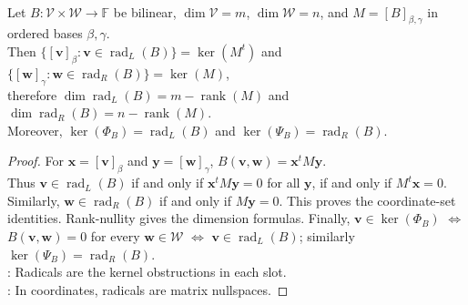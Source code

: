 \begin{proposition} \label{prop:bilinear-radicals-matrix-and-dual-maps} \\
Let $B:\mathcal{V}\times\mathcal{W}\to\mathbb{F}$ be bilinear, $\dim\mathcal{V}=m$, $\dim\mathcal{W}=n$, and $M=[B]_{\beta,\gamma}$ in ordered bases $\beta,\gamma$.\\
Then $\{[\mathbf{v}]_{\beta}:\mathbf{v}\in\operatorname{rad}_{L}(B)\}=\ker(M^t)$ and $\{[\mathbf{w}]_{\gamma}:\mathbf{w}\in\operatorname{rad}_{R}(B)\}=\ker(M)$,\\
therefore $\dim\operatorname{rad}_{L}(B)=m-\operatorname{rank}(M)$ and $\dim\operatorname{rad}_{R}(B)=n-\operatorname{rank}(M)$.\\
Moreover, $\ker(\Phi_B)=\operatorname{rad}_{L}(B)$ and $\ker(\Psi_B)=\operatorname{rad}_{R}(B)$.
\begin{proof}
For $\mathbf{x}=[\mathbf{v}]_{\beta}$ and $\mathbf{y}=[\mathbf{w}]_{\gamma}$, $B(\mathbf{v},\mathbf{w})=\mathbf{x}^{t}M\mathbf{y}$.\\
Thus $\mathbf{v}\in\operatorname{rad}_{L}(B)$ if and only if $\mathbf{x}^{t}M\mathbf{y}=0$ for all $\mathbf{y}$, if and only if $M^t\mathbf{x}=0$. Similarly, $\mathbf{w}\in\operatorname{rad}_{R}(B)$ if and only if $M\mathbf{y}=0$. This proves the coordinate-set identities. Rank-nullity gives the dimension formulas. Finally, $\mathbf{v}\in\ker(\Phi_B)$ $\Longleftrightarrow$ $B(\mathbf{v},\mathbf{w})=0$ for every $\mathbf{w}\in\mathcal{W}$ $\Longleftrightarrow$ $\mathbf{v}\in\operatorname{rad}_{L}(B)$; similarly $\ker(\Psi_B)=\operatorname{rad}_{R}(B)$.\\
: Radicals are the kernel obstructions in each slot.\\
: In coordinates, radicals are matrix nullspaces.
\end{proof}
\end{proposition}


